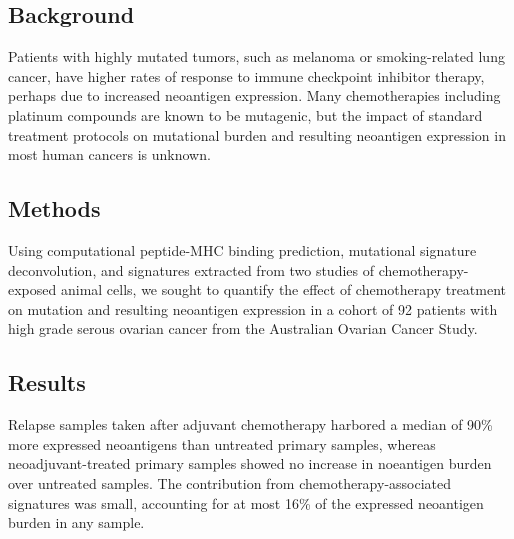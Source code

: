 \subsection*{Background}
Patients with highly mutated tumors, such as melanoma or smoking-related lung cancer, have higher rates of response to immune checkpoint inhibitor therapy, perhaps due to increased neoantigen expression. Many chemotherapies including platinum compounds are known to be mutagenic, but the impact of standard treatment protocols on mutational burden and resulting neoantigen expression in most human cancers is unknown.


\subsection*{Methods}

Using computational peptide-MHC binding prediction, mutational signature deconvolution, and signatures extracted from two studies of chemotherapy-exposed animal cells, we sought to quantify the effect of chemotherapy treatment on mutation and resulting neoantigen expression in a cohort of 92 patients with high grade serous ovarian cancer from the Australian Ovarian Cancer Study.


\subsection*{Results}
Relapse samples taken after adjuvant chemotherapy harbored a median of 90\% more expressed neoantigens than untreated primary samples, whereas neoadjuvant-treated primary samples showed no increase in noeantigen burden over untreated samples. The contribution from chemotherapy-associated signatures was small, accounting for at most 16\% of the expressed neoantigen burden in any sample.

